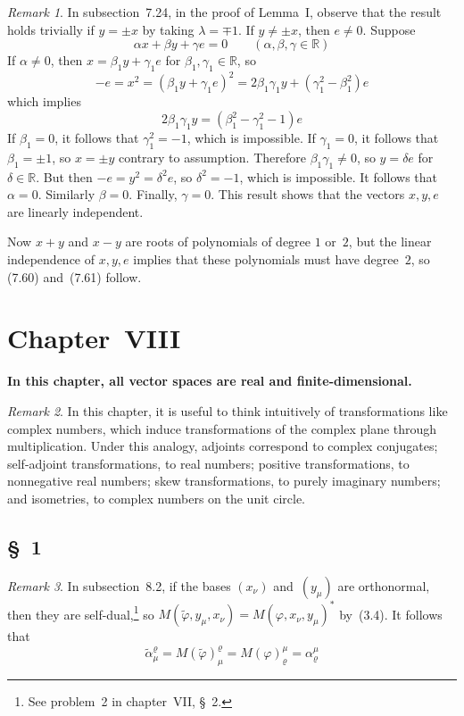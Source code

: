 \documentclass[letterpaper,12pt]{article}
\newcommand{\R}{\mathbb{R}}
\newcommand{\adj}[1]{\widetilde{#1}}
\theoremstyle{definition}
\theoremstyle{remark}
\newtheorem*{rmk}{Remark}
\begin{document}
\begin{rmk}
In subsection~7.24, in the proof of Lemma~I, observe that the result holds trivially if \(y=\pm x\) by taking \(\lambda=\mp 1\). If \(y\ne\pm x\), then \(e\ne 0\). Suppose
\[\alpha x+\beta y+\gamma e=0\qquad(\alpha,\beta,\gamma\in\R)\]
If \(\alpha\ne 0\), then \(x=\beta_1y+\gamma_1e\) for \(\beta_1,\gamma_1\in\R\), so
\[-e=x^2=(\beta_1y+\gamma_1e)^2=2\beta_1\gamma_1y+(\gamma_1^2-\beta_1^2)e\]
which implies
\[2\beta_1\gamma_1y=(\beta_1^2-\gamma_1^2-1)e\]
If \(\beta_1=0\), it follows that \(\gamma_1^2=-1\), which is impossible. If \(\gamma_1=0\), it follows that \(\beta_1=\pm 1\), so \(x=\pm y\) contrary to assumption. Therefore \(\beta_1\gamma_1\ne 0\), so \(y=\delta e\) for \(\delta\in\R\). But then \(-e=y^2=\delta^2 e\), so \(\delta^2=-1\), which is impossible. It follows that \(\alpha=0\). Similarly \(\beta=0\). Finally, \(\gamma=0\). This result shows that the vectors \(x,y,e\) are linearly independent.

Now \(x+y\) and \(x-y\) are roots of polynomials of degree \(1\) or~\(2\), but the linear independence of \(x,y,e\) implies that these polynomials must have degree~\(2\), so (7.60) and~(7.61) follow.
\end{rmk}

\newpage
\section*{Chapter~VIII}
\textbf{In this chapter, all vector spaces are real and finite-dimensional.}

\begin{rmk}
In this chapter, it is useful to think intuitively of transformations like complex numbers, which induce transformations of the complex plane through multiplication. Under this analogy, adjoints correspond to complex conjugates; self-adjoint transformations, to real numbers; positive transformations, to nonnegative real numbers; skew transformations, to purely imaginary numbers; and isometries, to complex numbers on the unit circle.
\end{rmk}

\subsection*{\S~1}
\begin{rmk}
In subsection~8.2, if the bases \((x_{\nu})\) and~\((y_{\mu})\) are orthonormal, then they are self-dual,\footnote{See problem~2 in chapter~VII, \S~2.} so \(M(\adj{\varphi},y_{\mu},x_{\nu})=M(\varphi,x_{\nu},y_{\mu})^*\) by~(3.4). It follows that
\[\tilde{\alpha}^{\varrho}_{\mu}=M(\adj{\varphi})^{\varrho}_{\mu}=M(\varphi)^{\mu}_{\varrho}=\alpha^{\mu}_{\varrho}\]
\end{rmk}
\end{document}
